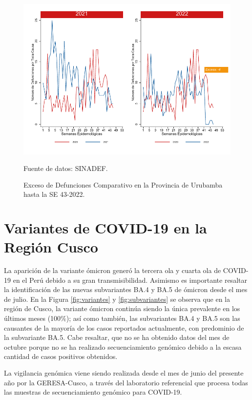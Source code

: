 \documentclass[12pt,a4paper,openany]{book}
\begin{document}
	\begin{figure}[h]
		\caption{Exceso de Defunciones Comparativo en la Provincia de Urubamba hasta la SE 43-2022.}\label{fig:exceso_urub}
		\begin{center}
			\includegraphics[width=0.7\linewidth]{../figuras/exceso_13.pdf}
		\end{center}
		{\footnotesize {Fuente de datos: SINADEF.}}
	\end{figure}
	
	\clearpage
	
	\clearpage
	
	\section* {Variantes de COVID-19 en la Región Cusco}
	\noindent La aparición de la variante ómicron generó la tercera ola y cuarta ola de COVID-19 en el Perú debido a su gran transmisibilidad. Asimismo es importante resaltar la identificación de las nuevas subvariantes BA.4 y BA.5 de ómicron desde el mes de julio. En la Figura \ref{fig:variantes} y \ref{fig:subvariantes} se observa que en la región de Cusco, la variante ómicron continúa siendo la única prevalente en los últimos meses (100$\%$); así como también, las subvariantes BA.4 y BA.5 son las causantes de la mayoría de los casos reportados actualmente, con predominio de la subvariante BA.5.
	Cabe resaltar, que no se ha obtenido datos del mes de octubre porque no se ha realizado secuenciamiento genómico debido a la escasa cantidad de casos positivos obtenidos.
	 
	La vigilancia genómica viene siendo realizada desde el mes de junio del presente año por la GERESA-Cusco, a través del laboratorio referencial que procesa todas las muestras de secuenciamiento genómico para COVID-19.
	
\end{document}
